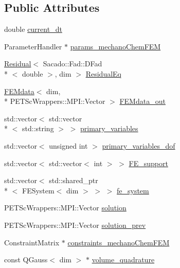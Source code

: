 \subsection*{Public Attributes}
\begin{DoxyCompactItemize}
\item 
double \hyperlink{classmechano_chem_f_e_m_a68c7b36b181a92a91945137308e74a6d}{current\-\_\-dt}
\item 
Parameter\-Handler $\ast$ \hyperlink{classmechano_chem_f_e_m_ae9ff200523ba41f15a09a1d39af96649}{params\-\_\-mechano\-Chem\-F\-E\-M}
\item 
\hyperlink{class_residual}{Residual}$<$ Sacado\-::\-Fad\-::\-D\-Fad\\*
$<$ double $>$, dim $>$ \hyperlink{classmechano_chem_f_e_m_adeaa7307c79088ccde0e35feb27eb0b0}{Residual\-Eq}
\item 
\hyperlink{class_f_e_mdata}{F\-E\-Mdata}$<$ dim, \\*
P\-E\-T\-Sc\-Wrappers\-::\-M\-P\-I\-::\-Vector $>$ \hyperlink{classmechano_chem_f_e_m_af7b22336bf40c3a2865dff2cb708136d}{F\-E\-Mdata\-\_\-out}
\item 
std\-::vector$<$ std\-::vector\\*
$<$ std\-::string $>$ $>$ \hyperlink{classmechano_chem_f_e_m_a4933860ad833b7b9bd2b8effee5c36d6}{primary\-\_\-variables}
\item 
std\-::vector$<$ unsigned int $>$ \hyperlink{classmechano_chem_f_e_m_a20e37946082ad677ffab164a6dead8b3}{primary\-\_\-variables\-\_\-dof}
\item 
std\-::vector$<$ std\-::vector$<$ int $>$ $>$ \hyperlink{classmechano_chem_f_e_m_ab0e06106bfe2ab795399d91169290e8a}{F\-E\-\_\-support}
\item 
std\-::vector$<$ std\-::shared\-\_\-ptr\\*
$<$ F\-E\-System$<$ dim $>$ $>$ $>$ \hyperlink{classmechano_chem_f_e_m_abeb9cdd6078108148320406c68bfa0d1}{fe\-\_\-system}
\item 
P\-E\-T\-Sc\-Wrappers\-::\-M\-P\-I\-::\-Vector \hyperlink{classmechano_chem_f_e_m_ae539da5c193ce7d8d07f654067f111ca}{solution}
\item 
P\-E\-T\-Sc\-Wrappers\-::\-M\-P\-I\-::\-Vector \hyperlink{classmechano_chem_f_e_m_ab5b94542feace0c45c2c69696ce9a266}{solution\-\_\-prev}
\item 
Constraint\-Matrix $\ast$ \hyperlink{classmechano_chem_f_e_m_ae2063c17722c7eae9e91a4ad6b353b34}{constraints\-\_\-mechano\-Chem\-F\-E\-M}
\item 
const Q\-Gauss$<$ dim $>$ $\ast$ \hyperlink{classmechano_chem_f_e_m_a7e2363a91f6f1626f463f3a06108c03b}{volume\-\_\-quadrature}

\end{DoxyCompactItemize}
